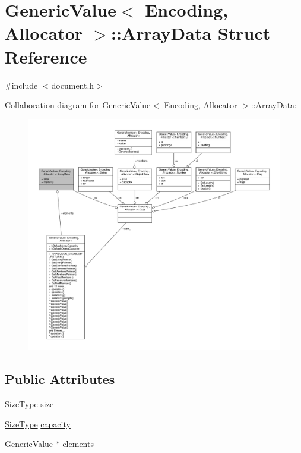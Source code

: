 \hypertarget{structGenericValue_1_1ArrayData}{}\section{Generic\+Value$<$ Encoding, Allocator $>$\+:\+:Array\+Data Struct Reference}
\label{structGenericValue_1_1ArrayData}


{\ttfamily \#include $<$document.\+h$>$}



Collaboration diagram for Generic\+Value$<$ Encoding, Allocator $>$\+:\+:Array\+Data\+:
\nopagebreak
\begin{figure}[H]
\begin{center}
\leavevmode
\includegraphics[width=350pt]{structGenericValue_1_1ArrayData__coll__graph}
\end{center}
\end{figure}
\subsection*{Public Attributes}
\begin{DoxyCompactItemize}
\item 
\hyperlink{rapidjson_8h_a5ed6e6e67250fadbd041127e6386dcb5}{Size\+Type} \hyperlink{structGenericValue_1_1ArrayData_a5306856f64aea8ec53abf263ed2a35e2}{size}
\item 
\hyperlink{rapidjson_8h_a5ed6e6e67250fadbd041127e6386dcb5}{Size\+Type} \hyperlink{structGenericValue_1_1ArrayData_a0c6fe03c00e13d14b95abd31048aa1f5}{capacity}
\item 
\hyperlink{classGenericValue}{Generic\+Value} $\ast$ \hyperlink{structGenericValue_1_1ArrayData_a86df976cb6f65924aca20eb9bd35553e}{elements}
\end{DoxyCompactItemize}


